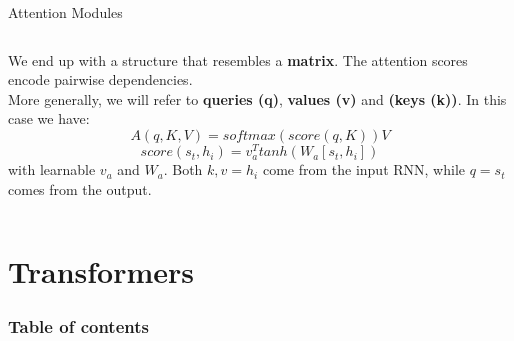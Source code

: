 \documentclass[UKenglish]{beamer}
\begin{document}
\begin{frame}{Attention Modules}
\begin{columns}[onlytextwidth]
    \begin{column}{0.50\textwidth}
    We end up with a structure that resembles a \textbf{matrix}. The attention scores encode pairwise dependencies.\\
     {More generally, we will refer to \textbf{queries (q)}, \textbf{values (v)} and \textbf{(keys (k))}. In this case we have:
    $$ A(q,K,V) = softmax(score(q,K))V$$
    $$score(s_t,h_i) = v_a^Ttanh(W_a[s_t,h_i])$$
    with learnable $v_a$ and $W_a$. Both $k,v=h_i$ come from the input RNN, while $q=s_t$ comes from the output. }
    \end{column}
\end{columns}
\end{frame}

\section{Transformers}
\begin{frame}
    \frametitle{Table of contents}
    \tableofcontents[currentsection]
\end{frame}
\end{document}
